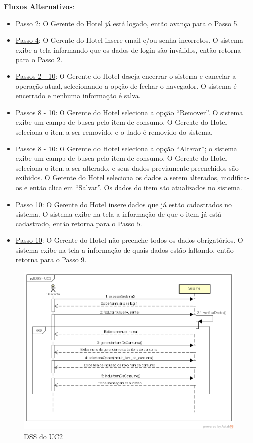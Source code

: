 \documentclass[notitlepage]{article}
\begin{document}
\textbf{Fluxos Alternativos}:\\
\begin{itemize}
\item \underline{Passo 2}: O Gerente do Hotel já está logado, então avança para o Passo 5.
\item \underline{Passo 4}: O Gerente do Hotel insere email e/ou senha incorretos. O sistema exibe a tela informando que os dados de login são inválidos, então retorna para o Passo 2.
\item \underline{Passos 2 - 10}: O Gerente do Hotel deseja encerrar o sistema e cancelar a operação atual, selecionando a opção de fechar o navegador. O sistema é encerrado e nenhuma informação é salva.  
\item \underline{Passos 8 - 10}: O Gerente do Hotel seleciona a opção “Remover”. O sistema exibe um campo de busca pelo item de consumo. O Gerente do Hotel seleciona o item a ser removido, e o dado é removido do sistema.    
\item \underline{Passos 8 - 10}: O Gerente do Hotel seleciona a opção “Alterar”; o sistema exibe um campo de busca pelo item de consumo. O Gerente do Hotel seleciona o item a ser alterado, e seus dados previamente preenchidos são exibidos. O Gerente do Hotel seleciona os dados a serem alterados, modifica-os e então clica em “Salvar”. Os dados do item são atualizados no sistema.
\item \underline{Passo 10}: O Gerente do Hotel insere dados que já estão cadastrados no sistema. O sistema exibe na tela a informação de que o item já está cadastrado, então retorna para o Passo 5.
\item \underline{Passo 10}: O Gerente do Hotel não preenche todos os dados obrigatórios. O sistema exibe na tela a informação de quais dados estão faltando, então retorna para o Passo 9.

\end{itemize}

\begin{figure}[!htbp]
	\centering
  \includegraphics[scale=0.65]{UC2.png}
  \caption{DSS do UC2}
  \label{fig:UC2}
\end{figure}
\end{document}
